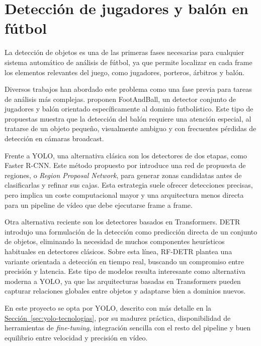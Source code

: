 \section{Detección de jugadores y balón en fútbol}

La detección de objetos es una de las primeras fases necesarias para cualquier sistema automático de análisis de fútbol, ya que permite localizar en cada frame los elementos relevantes del juego, como jugadores, porteros, árbitros y balón.

Diversos trabajos han abordado este problema como una fase previa para tareas de análisis más complejas. \citet{KomorowskiFootAndBall2020} proponen FootAndBall, un detector conjunto de jugadores y balón orientado específicamente al dominio futbolístico. Este tipo de propuestas muestra que la detección del balón requiere una atención especial, al tratarse de un objeto pequeño, visualmente ambiguo y con frecuentes pérdidas de detección en cámaras broadcast.

Frente a YOLO, una alternativa clásica son los detectores de dos etapas, como Faster R-CNN. Este método propuesto por \citet{RenFasterRCNN2015} introduce una red de propuesta de regiones, o \textit{Region Proposal Network}, para generar zonas candidatas antes de clasificarlas y refinar sus cajas. Esta estrategia suele ofrecer detecciones precisas, pero implica un coste computacional mayor y una arquitectura menos directa para un pipeline de vídeo que debe ejecutarse frame a frame.

Otra alternativa reciente son los detectores basados en Transformers. DETR \citep{CarionDETR2020} introdujo una formulación de la detección como predicción directa de un conjunto de objetos, eliminando la necesidad de muchos componentes heurísticos habituales en detectores clásicos. Sobre esta línea, RF-DETR \citep{RobinsonRFDETR2026} plantea una variante orientada a detección en tiempo real, buscando un compromiso entre precisión y latencia. Este tipo de modelos resulta interesante como alternativa moderna a YOLO, ya que las arquitecturas basadas en Transformers pueden capturar relaciones globales entre objetos y adaptarse bien a dominios nuevos.

En este proyecto se opta por YOLO, descrito con más detalle en la \hyperref[sec:yolo-tecnologias]{Sección~\ref*{sec:yolo-tecnologias}}, por su madurez práctica, disponibilidad de herramientas de \textit{fine-tuning}, integración sencilla con el resto del pipeline y buen equilibrio entre velocidad y precisión en vídeo.